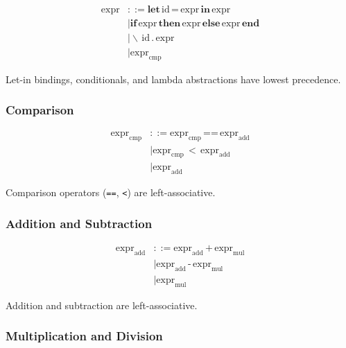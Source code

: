 \documentclass[12pt]{article}
\begin{document}
\begin{align*}
\text{expr} &::= \textbf{let} \, \text{id} \, \textbf{=} \, \text{expr} \, \textbf{in} \, \text{expr} \\
            &\mid \textbf{if} \, \text{expr} \, \textbf{then} \, \text{expr} \, \textbf{else} \, \text{expr} \, \textbf{end} \\
            &\mid \backslash \, \text{id} \, . \, \text{expr} \\
            &\mid \text{expr}_{\text{cmp}}
\end{align*}

Let-in bindings, conditionals, and lambda abstractions have lowest precedence.

\subsubsection{Comparison}

\begin{align*}
\text{expr}_{\text{cmp}} &::= \text{expr}_{\text{cmp}} \, \textbf{==} \, \text{expr}_{\text{add}} \\
                         &\mid \text{expr}_{\text{cmp}} \, < \, \text{expr}_{\text{add}} \\
                         &\mid \text{expr}_{\text{add}}
\end{align*}

Comparison operators (\texttt{==}, \texttt{<}) are left-associative.

\subsubsection{Addition and Subtraction}

\begin{align*}
\text{expr}_{\text{add}} &::= \text{expr}_{\text{add}} \, \textbf{+} \, \text{expr}_{\text{mul}} \\
                         &\mid \text{expr}_{\text{add}} \, \textbf{-} \, \text{expr}_{\text{mul}} \\
                         &\mid \text{expr}_{\text{mul}}
\end{align*}

Addition and subtraction are left-associative.

\subsubsection{Multiplication and Division}
\end{document}
